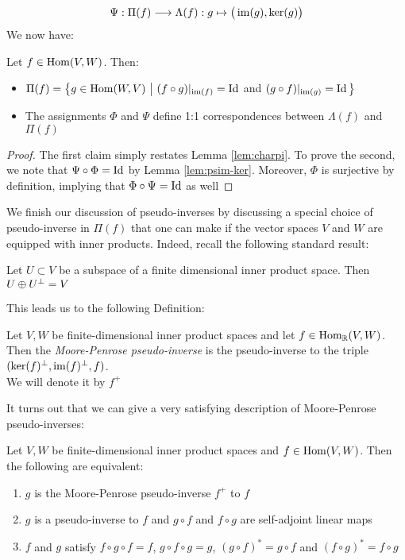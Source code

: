 \documentclass{dsp}
\begin{document}
\[
\Psi: \Pi(f)\longrightarrow \Lambda(f): g\mapsto \big(\operatorname{im}(g),\ker(g)\big)
\]
We now have:
\begin{lemma}\label{lem:psinverses}
	Let $f \in \operatorname{Hom}(V,W)$. Then:
	\begin{itemize}
		\item 
		$\Pi(f)=\big\{ g \in \operatorname{Hom}(W,V)\,\,\big\vert\,\, (f\circ g)\arrowvert_{\operatorname{im}(f)}=\operatorname{Id}$ \textrm{ and } $(g\circ f)\arrowvert_{\operatorname{im}(g)}=\operatorname{Id} \big\} $
		\item The assignments $\Phi$ and $\Psi$ define 1:1 correspondences between $\Lambda(f)$ and $\Pi(f)$
	\end{itemize}
\end{lemma}


\begin{proof}
	The first claim simply restates Lemma \ref{lem:charpi}. To prove the second, we note that $\Psi\circ \Phi=\operatorname{Id}$  by Lemma \ref{lem:psim-ker}. Moreover, $\Phi$ is surjective by definition, implying that $\Phi\circ \Psi =\operatorname{Id}$ as well
\end{proof}



\noindent We finish our discussion of pseudo-inverses by discussing a special choice of pseudo-inverse in $\Pi(f)$ that one can make if the vector spaces $V$ and $W$ are equipped with inner products. Indeed, recall the following standard result:

\begin{lemma}
 Let $U \subset V$ be a subspace of a finite dimensional inner product space. Then $U\oplus U^{\perp}=V$
\end{lemma}

This leads us to the following Definition:
\begin{definition}\label{def:mpinverse}
Let $V,W$ be finite-dimensional inner product spaces and let $f \in \operatorname{Hom}_{\mathbb{R}}(V,W)$. Then the \emph{Moore-Penrose pseudo-inverse} is the pseudo-inverse to the triple $(\ker(f)^\perp,\operatorname{im}(f)^\perp,f)$.\\ We will denote it by $f^+$
\end{definition}

\noindent It turns out that we can give a very satisfying description of Moore-Penrose pseudo-inverses:

\begin{lemma}\label{lem:mppschar}
	Let $V, W$ be finite-dimensional inner product spaces and $f \in \operatorname{Hom}(V,W)$. Then the following are equivalent:
	\begin{enumerate}
		\item $g$ is the Moore-Penrose pseudo-inverse $f^+$ to $f$
		\item $g$ is a pseudo-inverse to $f$ and $g\circ f$ and $f \circ g$ are self-adjoint linear maps
		\item $f$ and $g$ satisfy $f\circ g \circ f=f$, $g\circ f\circ g =g$,  $(g\circ f)^*=g\circ f$ and $(f\circ g)^* =f\circ g$
	\end{enumerate}
\end{lemma}
\end{document}

